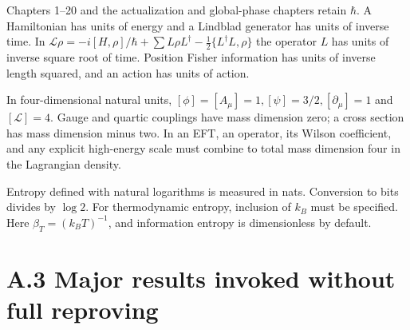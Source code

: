 \documentclass[
  11pt,
  oneside]{book}
\begin{document}
Chapters 1--20 and the actualization and global-phase chapters retain
\(\hbar\). A Hamiltonian has units of energy and a Lindblad generator
has units of inverse time. In
\(\mathcal L\rho=-i[H,\rho]/\hbar+\sum L\rho L^\dagger-\frac12\{L^\dagger L,\rho\}\)
the operator \(L\) has units of inverse square root of time. Position
Fisher information has units of inverse length squared, and an action
has units of action.

In four-dimensional natural units,
\([\phi]=[A_\mu]=1,[\psi]=3/2,[\partial_\mu]=1\) and \([\mathcal L]=4\).
Gauge and quartic couplings have mass dimension zero; a cross section
has mass dimension minus two. In an EFT, an operator, its Wilson
coefficient, and any explicit high-energy scale must combine to total
mass dimension four in the Lagrangian density.

Entropy defined with natural logarithms is measured in nats. Conversion
to bits divides by \(\log2\). For thermodynamic entropy, inclusion of
\(k_B\) must be specified. Here \(\beta_T=(k_BT)^{-1}\), and information
entropy is dimensionless by default.

\section{A.3 Major results invoked without full reproving}
\end{document}
